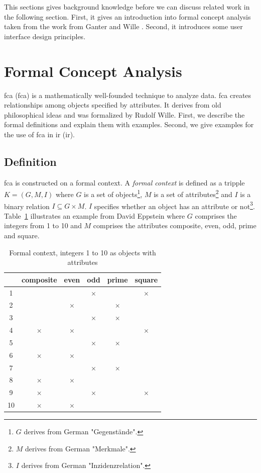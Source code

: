 \documentclass[11pt]{report}
\begin{document}
This sections gives background knowledge before we can discuss related work in the following section. First, it gives an introduction into formal concept analysis taken from the work from Ganter and Wille \cite{Ganter2012}. Second, it introduces some user interface design principles.

\section{Formal Concept Analysis}
\label{Formal Concept Analysis}

\acrlong{fca} (\acrshort{fca}) is a mathematically well-founded technique to analyze data. \acrshort{fca} creates relationships among objects specified by attributes. It derives from old philosophical ideas and was formalized by Rudolf Wille. First, we describe the formal definitions and explain them with examples. Second, we give examples for the use of \acrshort{fca} in \acrlong{ir} (\acrshort{ir}).

\subsection{Definition}

\acrshort{fca} \cite{Ganter2012} is constructed on a formal context. A \textit{formal context} is defined as a tripple $K = (G, M, I)$ where $G$ is a set of objects\footnote{$G$ derives from German "Gegenstände".}, $M$ is a set of attributes\footnote{$M$ derives from German "Merkmale".} and $I$ is a binary relation $I \subseteq G \times M$. $I$ specifies whether an object has an attribute or not\footnote{$I$ derives from German "Inzidenzrelation".}. Table~\ref{table:example} illustrates an example from David Eppstein \cite{fcaexample} where $G$ comprises the integers from 1 to 10 and $M$ comprises the attributes composite, even, odd, prime and square. \\


\begin{table}[h]
\caption{Formal context, integers 1 to 10 as objects with attributes}
\label{table:example}
\centering

\def\arraystretch{1.2}%
\begin{tabular}{ | c | c c c c c |}
\hline
  & composite & even & odd & prime & square\\
\hline

1 & & & $\times$ & &$\times$\\ 
2 & & $\times$ & & $\times$ &\\
3 & & & $\times$ & $\times$ &\\ 
4 & $\times$ & $\times$ & & & $\times$\\
5 & & & $\times$ & $\times$ &\\
6 & $\times$ & $\times$ & & &\\
7 & & & $\times$ & $\times$ &\\ 
8 & $\times$ & $\times$ & & &\\
9 & $\times$ & & $\times$ & & $\times$\\
10 & $\times$ & $\times$ & & &\\ \hline


\end{tabular}
\end{table}
\end{document}
